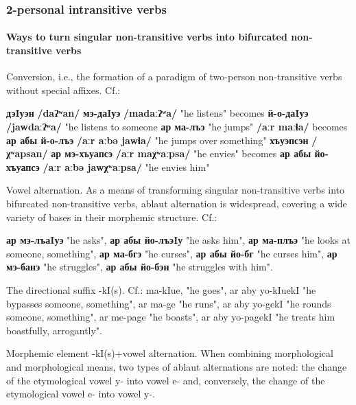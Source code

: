 \documentclass[a4paper,12pt]{book}
\newcommand{\1}[1]{\textbf{\emph{#1}}} %
\newcommand{\2}[1]{\textbf{[#1]}} %
\newcommand{\3}[1]{\fontsize{11pt}{0cm}\textbf{\emph{#1}}} %
\newcommand{\4}[1]{\fontsize{10pt}{0cm}\emph{#1}}	%
\newcommand{\5}[1]{\textbf{/#1/}} %
\newcommand{\6}[1]{\textbf{[#1]}} %
\newcommand{\7}[1]{\fontsize{12pt}{0cm}\emph{#1}} %
\newcommand{\8}[1]{\fontsize{12pt}{0cm}`#1'} %
\newcommand{\9}[1]{\fontsize{12pt}{0cm}(lit. `#1')} %
\newcommand{\glossphonemics}[1]{\textbf{/#1/}} %
\begin{document}
\subsubsection{2-personal intransitive verbs}
\paragraph{Ways to turn singular non-transitive verbs into bifurcated non-transitive verbs}
\begin{xlist}
\ex Conversion, i.e., the formation of a paradigm of two-person non-transitive verbs without special affixes. Cf.: 
	\begin{xlist}
	\ex \textbf{дэIуэн} \glossphonemics{daʔʷan} \textbf{мэ-даIуэ} \glossphonemics{madaːʔʷa} "he listens" becomes  \textbf{й-о-даIуэ} \glossphonemics{jawdaːʔʷa} "he listens to someone
	\ex \textbf{ар ма-лъэ} "he jumps" \glossphonemics{aːr maːɬa} becomes \textbf{ар абы й-о-лъэ} \glossphonemics{aːr aːbə jawɬa} "he jumps over something"
	\ex \textbf{хъуэпсэн} \glossphonemics{χʷapsan} \textbf{ар мэ-хъуапсэ} \glossphonemics{aːr maχʷaːpsa} "he envies" becomes \textbf{ар абы йо-хъуапсэ} \glossphonemics{aːr aːbə jawχʷaːpsa} "he envies him"
	\end{xlist}

\ex Vowel alternation. As a means of transforming singular non-transitive verbs into bifurcated non-transitive verbs, ablaut alternation is widespread, covering a wide variety of bases in their morphemic structure. Cf.: 
	\begin{xlist}
	\ex \textbf{ар мэ-лъаIуэ} "he asks", \textbf{ар абы йо-лъэIу} "he asks him",
	\ex \textbf{ар ма-плъэ} "he looks at someone, something",
	\ex \textbf{ар ма-бгэ} "he curses", \textbf{ар абы йо-бг} "he curses him",
	\ex \textbf{ар мэ-банэ} "he struggles", \textbf{ар абы йо-бэн} "he struggles with him".
	\end{xlist}



\ex The directional suffix -kI(s). Cf.: ma-kIue, "he goes", ar aby yo-kIuekI "he bypasses someone, something", ar ma-ge "he runs", ar aby yo-gekI "he rounds someone, something", ar me-page "he boasts", ar aby yo-pagekI "he treats him boastfully, arrogantly".

\ex Morphemic element -kI(s)+vowel alternation. When combining morphological and morphological means, two types of ablaut alternations are noted: the change of the etymological vowel y- into vowel e- and, conversely, the change of the etymological vowel e- into vowel y-.


\end{xlist}
\end{document}
